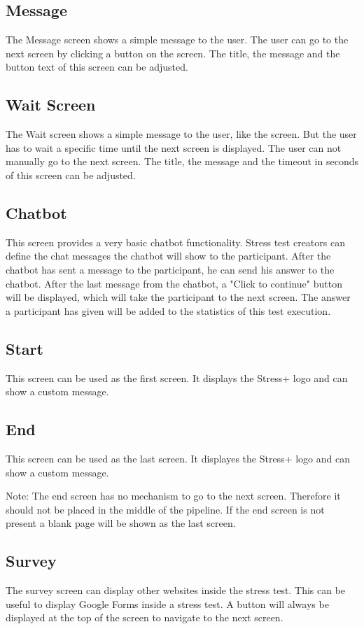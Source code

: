 \subsection{Message}
\label{sec:screens-message}
The Message screen shows a simple message to the user.
The user can go to the next screen by clicking a button on the screen.
The title, the message and the button text of this screen can be adjusted.

\subsection{Wait Screen}
\label{sec:screens-wait-screen}

The Wait screen shows a simple message to the user, like the  screen.
But the user has to wait a specific time until the next screen is displayed.
The user can not manually go to the next screen.
The title, the message and the timeout in seconds of this screen can be adjusted.

\subsection{Chatbot}
\label{sec:screens-chatbot}

This screen provides a very basic chatbot functionality.
Stress test creators can define the chat messages the chatbot will show to the participant.
After the chatbot has sent a message to the participant, he can send his answer to the chatbot.
After the last message from the chatbot, a "Click to continue" button will be displayed, which will take the participant to the next screen.
The answer a participant has given will be added to the statistics of this test execution.

\subsection{Start}
\label{sec:screens-start}

This screen can be used as the first screen.
It displays the Stress+ logo and can show a custom message.

\subsection{End}
\label{sec:screens-end}

This screen can be used as the last screen.
It displayes the Stress+ logo and can show a custom message.

Note: The end screen has no mechanism to go to the next screen. Therefore it should not be placed in the middle of the pipeline.
If the end screen is not present a blank page will be shown as the last screen.

\subsection{Survey}
\label{sec:screens-survey}

The survey screen can display other websites inside the stress test. 
This can be useful to display Google Forms inside a stress test.
A button will always be displayed at the top of the screen to navigate to the next screen.
